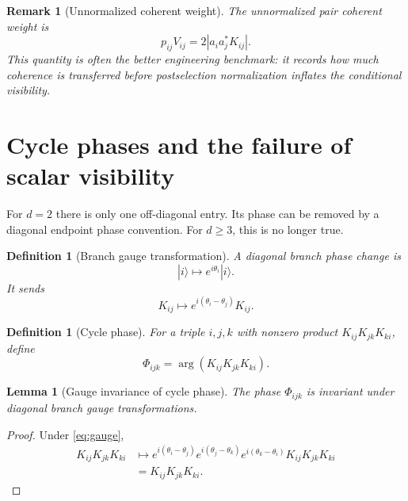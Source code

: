 \documentclass[reprint,aps,pra,superscriptaddress,nofootinbib,longbibliography]{revtex4-2}
\newtheorem{definition}[theorem]{Definition}
\newtheorem{lemma}[theorem]{Lemma}
\newtheorem{remark}[theorem]{Remark}
\newcommand{\ket}[1]{|#1\rangle}
\begin{document}
\begin{remark}[Unnormalized coherent weight]
The unnormalized pair coherent weight is
\begin{equation}
p_{ij}V_{ij}
=
2|a_i a_j^*K_{ij}|.
\label{eq:unnormalized-weight}
\end{equation}
This quantity is often the better engineering benchmark: it records how much coherence is transferred before postselection normalization inflates the conditional visibility.
\end{remark}

\section{Cycle phases and the failure of scalar visibility}
\label{sec:cycles}

For \(d=2\) there is only one off-diagonal entry.  Its phase can be removed by a diagonal endpoint phase convention.  For \(d\ge3\), this is no longer true.

\begin{definition}[Branch gauge transformation]
A diagonal branch phase change is
\begin{equation}
\ket{i}\mapsto e^{i\theta_i}\ket{i}.
\end{equation}
It sends
\begin{equation}
K_{ij}\mapsto e^{i(\theta_i-\theta_j)}K_{ij}.
\label{eq:gauge}
\end{equation}
\end{definition}

\begin{definition}[Cycle phase]
For a triple \(i,j,k\) with nonzero product \(K_{ij}K_{jk}K_{ki}\), define
\begin{equation}
\Phi_{ijk}
=
\arg(K_{ij}K_{jk}K_{ki}).
\label{eq:cycle-phase}
\end{equation}
\end{definition}

\begin{lemma}[Gauge invariance of cycle phase]
The phase \(\Phi_{ijk}\) is invariant under diagonal branch gauge transformations.
\end{lemma}

\begin{proof}
Under \eqref{eq:gauge},
\[
\begin{aligned}
K_{ij}K_{jk}K_{ki}
&\mapsto
e^{i(\theta_i-\theta_j)}
e^{i(\theta_j-\theta_k)}
e^{i(\theta_k-\theta_i)}
K_{ij}K_{jk}K_{ki}
\\
&=
K_{ij}K_{jk}K_{ki}.
\end{aligned}
\]
\end{proof}
\end{document}
